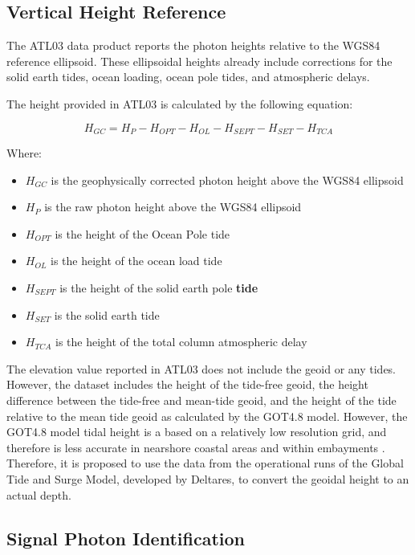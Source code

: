 \subsection{Vertical Height Reference}
The ATL03 data product reports the photon heights relative to the WGS84 reference ellipsoid. These ellipsoidal heights already include corrections for the solid earth tides, ocean loading, ocean pole tides, and atmospheric delays.

The height provided in ATL03 is calculated by the following equation:

\[H_{GC} =  H_{P} - H_{OPT} - H_{OL} - H_{SEPT} - H_{SET} - H_{TCA}\]

Where:

\begin{itemize}

      \item \(H_{GC}\) is the geophysically corrected photon height above the WGS84 ellipsoid
      \item \(H_{P}\) is the raw photon height above the WGS84 ellipsoid
      \item \(H_{OPT}\) is the height of the Ocean Pole tide
      \item \(H_{OL}\) is the height of the ocean load tide
      \item \(H_{SEPT}\) is the height of the solid earth pole \textbf{tide}
      \item \(H_{SET}\) is the solid earth tide
      \item \(H_{TCA}\) is the height of the total column atmospheric delay
\end{itemize}

The elevation value reported in ATL03 does not include the geoid or any tides. However, the dataset includes the height of the tide-free geoid, the height difference between the tide-free and mean-tide geoid, and the height of the tide relative to the mean tide geoid as calculated by the GOT4.8 model. However, the GOT4.8 model tidal height is a based on a relatively low resolution grid, and therefore is less accurate in nearshore coastal areas and within embayments \parencite{Neumann2019e}. Therefore, it is proposed to use the data from the operational runs of the Global Tide and Surge Model, developed by Deltares, to convert the geoidal height to an actual depth.

\subsection{Signal Photon Identification}

